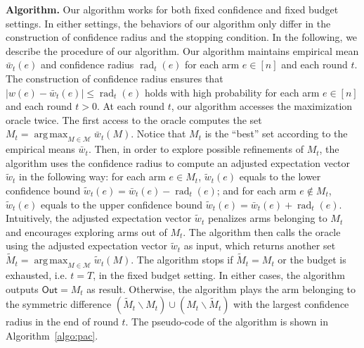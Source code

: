 \documentclass{article}
\newcommand{\M}{\mathcal M}
\newcommand{\del}{\backslash}
\DeclareMathOperator{\rad}{rad}
\DeclareMathOperator*{\argmax}{arg\,max}
\newcommand{\out}{\mathsf{Out}}
\begin{document}
\begin{spacing}{1.1}
\textbf{Algorithm.} 
Our algorithm works for both fixed confidence and fixed budget settings.
In either settings, the behaviors of our algorithm only differ in the construction of confidence radius and the stopping condition.
In the following, we describe the procedure of our algorithm.
Our algorithm maintains empirical mean $\bar w_t(e)$ and confidence radius $\rad_t(e)$ for each arm $e\in[n]$ and each round $t$.
The construction of confidence radius ensures that $|w(e)-\bar w_t(e)| \le \rad_t(e)$ holds with high probability for each arm $e \in [n]$ and each round $t>0$.
At each round $t$, our algorithm accesses the maximization oracle twice. 
The first access to the oracle computes the set $M_t=\argmax_{M\in \M} \bar w_t(M)$.
Notice that $M_t$ is the ``best'' set according to the empirical means $\bar w_t$.
Then, in order to explore possible refinements of $M_t$, the algorithm uses the confidence radius to compute an adjusted expectation vector $\tilde w_t$ in the following way: for each arm $e \in M_t$, $\tilde w_t(e)$ equals to the lower confidence bound $\tilde w_t(e) = \bar w_t(e)-\rad_t(e)$; and for each arm $e\not\in M_t$, $\tilde w_t(e)$ equals to the upper confidence bound $\tilde w_t(e)=\bar w_t(e)+\rad_t(e)$.
Intuitively, the adjusted expectation vector $\tilde w_t$ penalizes arms belonging to $M_t$ and encourages exploring arms out of $M_t$.
The algorithm then calls the oracle using the adjusted expectation vector $\tilde w_t$ as input, which returns another set $\tilde M_t = \argmax_{M\in \M} \tilde w_t(M)$.
The algorithm stops if $\tilde M_t= M_t$ or the budget is exhausted, i.e. $t=T$, in the fixed budget setting.
In either cases, the algorithm outputs $\out=M_t$ as result.
Otherwise, the algorithm plays the arm belonging to the symmetric difference $(\tilde M_t \del M_t) \cup (M_t \del \tilde M_t)$ with the largest confidence radius in the end of round $t$.
The pseudo-code of the algorithm is shown in Algorithm~\ref{algo:pac}. 


\end{spacing}
\end{document}
